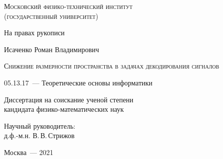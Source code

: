 \thispagestyle{empty}


\begin{titlepage}
	\begin{center}
		\textsc{Московский физико-технический институт \\ (государственный университет)}\\
	\end{center}
	\vspace{1.5cm}
	\begin{flushright}
		{На правах рукописи}
	\end{flushright}
	\vspace{2cm}
	\begin{center}
		{Исаченко Роман Владимирович}
		\par
		\vspace{2cm}
		\textsc{Снижение размерности пространства в задачах декодирования сигналов}
		\par
		\vspace{2cm}
		{05.13.17~--- Теоретические основы информатики}
		\par
		\vspace{2cm}
		{Диссертация на соискание ученой степени\\
			кандидата физико-математических наук}
	\end{center}
	\vspace{2cm}
	\hfill\parbox{8,4cm}{Научный руководитель:
		\\д.ф.-м.н. В.\,В.\,Стрижов}
	\par
	\vspace{3.5cm}
	\begin{center}
		{Москва~--- 2021}
	\end{center}
\end{titlepage}